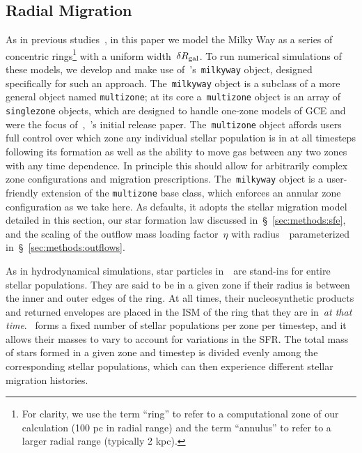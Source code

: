 \documentclass[draft2.tex]{subfiles}
\begin{document}
\subsection{Radial Migration} 
\label{sec:methods:migration} 
As in previous studies~\citep[e.g.][]{Matteucci1989, Schoenrich2009a, 
Minchev2013, Sharma2020}, in this paper we model the Milky Way as a series of 
concentric rings\footnote{
	For clarity, we use the term ``ring'' to refer to a computational zone of 
	our calculation (100 pc in radial range) and the term ``annulus'' to refer 
	to a larger radial range (typically 2 kpc). 
} with a uniform width~$\delta R_\text{gal}$. 
To run numerical simulations of these models, we develop and make use 
of~\vice's~\texttt{milkyway} object, designed specifically for such an 
approach. 
The~\texttt{milkyway} object is a subclass of a more general object named 
\texttt{multizone}; at its core a~\texttt{multizone} object is an array of 
\texttt{singlezone} objects, which are designed to handle one-zone models of 
GCE and were the focus of~\citet{Johnson2020},~\vice's initial release paper. 
The~\texttt{multizone} object affords users full control over which zone any 
individual stellar population is in at all timesteps following its formation as 
well as the ability to move gas between any two zones with any time dependence. 
In principle this should allow for arbitrarily complex zone configurations and 
migration prescriptions. 
The~\texttt{milkyway} object is a user-friendly extension of the 
\texttt{multizone} base class, which enforces an annular zone configuration as 
we take here. 
As defaults, it adopts the stellar migration model detailed in this section, 
our star formation law discussed in~\S~\ref{sec:methods:sfe}, and the scaling 
of the outflow mass loading factor~$\eta$ with radius~\rgal~parameterized 
in~\S~\ref{sec:methods:outflows}. 
\par 
As in hydrodynamical simulations, star particles in~\vice~are stand-ins for 
entire stellar populations. 
They are said to be in a given zone if their radius is between the inner and 
outer edges of the ring. 
At all times, their nucleosynthetic products and returned envelopes are placed 
in the ISM of the ring that they are in~\textit{at that time}. 
\vice~forms a fixed number of stellar populations per zone per timestep, and it 
allows their masses to vary to account for variations in the SFR. 
The total mass of stars formed in a given zone and timestep is divided evenly 
among the corresponding stellar populations, which can then experience 
different stellar migration histories. 
\end{document}
